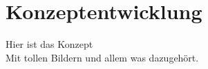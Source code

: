 \chapter{Konzeptentwicklung}
\label{chapter_Konzeptentwicklung}
Hier ist das Konzept\\
Mit tollen Bildern und allem was dazugehört.